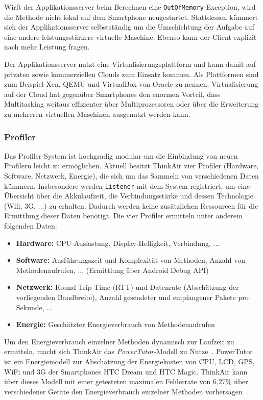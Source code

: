\documentclass{sigchi}
\begin{document}
Wirft der Applikationsserver beim Berechnen eine \texttt{OutOfMemory}-Exception, wird die Methode nicht lokal auf dem Smartphone neugestartet.
Stattdessen kümmert sich der Applikationsserver selbstständig um die Umschichtung der Aufgabe auf eine andere leistungsstärkere virtuelle Maschine.
Ebenso kann der Client explizit nach mehr Leistung fragen.

Der Applikationsserver nutzt eine Virtualisierungsplattform und kann damit auf privaten sowie kommerziellen Clouds zum Einsatz kommen.
Als Plattformen sind zum Beispiel Xen, QEMU und VirtualBox von Oracle zu nennen.
Virtualisierung auf der Cloud hat gegenüber Smartphones den enormen Vorteil, dass Multitasking weitaus effizienter über Multiprozessoren oder über die Erweiterung zu mehreren virtuellen Maschinen ausgenutzt werden kann.

\subsubsection{Profiler}

Das Profiler-System ist hochgradig modular um die Einbindung von neuen Profilern leicht zu ermöglichen.
Aktuell besitzt ThinkAir vier Profiler (Hardware, Software, Netzwerk, Energie), die sich um das Sammeln von verschiedenen Daten kümmern.
Insbesondere werden \texttt{Listener} mit dem System registriert, um eine Übersicht über die Akkulaufzeit, die Verbindungsstärke und dessen Technologie (Wifi, 3G, ...) zu erhalten.
Dadurch werden keine zusätzlichen Ressourcen für die Ermittlung dieser Daten benötigt.
Die vier Profiler ermitteln unter anderem folgenden Daten:
\begin{itemize}
	\item \textbf{Hardware:} CPU-Auslastung, Display-Helligkeit, Verbindung, ...
	\item \textbf{Software:} Ausführungszeit und Komplexität von Methoden, Anzahl von Methodenaufrufen, ... (Ermittlung über Android Debug API)
	\item \textbf{Netzwerk:} Round Trip Time (RTT) und Datenrate (Abschätzung der vorliegenden Bandbreite), Anzahl gesendeter und empfangener Pakete pro Sekunde, ...
	\item \textbf{Energie:} Geschätzter Energieverbrauch von Methodenaufrufen
\end{itemize}

Um den Energieverbrauch einzelner Methoden dynamisch zur Laufzeit zu ermitteln, macht sich ThinkAir das \emph{PowerTutor}-Modell zu Nutze~\cite{powertutor}.
PowerTutor ist ein Energiemodell zur Abschätzung der Energiekosten von CPU, LCD, GPS, WiFi und 3G der Smartphones HTC Dream und HTC Magic.
ThinkAir kann über dieses Modell mit einer getesteten maximalen Fehlerrate von 6,27\% über verschiedener Geräte den Energieverbrauch einzelner Methoden vorhersagen~\cite{thinkair}.
\end{document}
